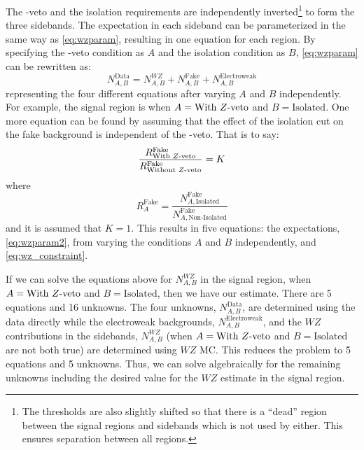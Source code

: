 The \z-veto and the isolation requirements are 
independently inverted\footnote{The thresholds are also slightly shifted 
so that there is a ``dead'' region between the signal regions and sidebands 
which is not used by either. This ensures separation between all regions.}
to form the three sidebands.
The expectation in each sideband can be parameterized
in the same way as \eqn\eqref{eq:wzparam}, resulting in one
equation for each region. By specifying the \z-veto condition
as $A$ and the isolation condition as $B$, \eqn\eqref{eq:wzparam}
can be rewritten as:
\begin{equation}
\label{eq:wzparam2}
N^{\textrm{Data}}_{A,B} =  N^{WZ}_{A,B} + N^{\textrm{Fake}}_{A,B} + N^{\textrm{Electroweak}}_{A,B}
\end{equation}
representing the four different equations after varying $A$ and $B$ independently.
For example, the signal region is when $A=\textrm{With \ensuremath{Z}-veto}$ and
$B=\textrm{Isolated}$.
One more equation can be found by assuming that the effect of 
the isolation cut on the fake background is independent of the \z-veto.
That is to say:
\begin{equation}
\label{eq:wz_constraint}
\frac{R^{\textrm{Fake}}_{\textrm{With \ensuremath{Z}-veto}}}{R^{\textrm{Fake}}_{\textrm{Without \ensuremath{Z}-veto}}} = K
\end{equation}
where 
\begin{equation}
R^{\textrm{Fake}}_{A} = 
\frac{N^{\textrm{Fake}}_{A,\textrm{Isolated}}}
{N^{\textrm{Fake}}_{A,\textrm{Non-Isolated}}}
\end{equation}
and it is assumed that $K=1$.
This results in five equations: the expectations,
\eqn\eqref{eq:wzparam2}, from varying the conditions $A$ and $B$ independently,
and \eqn\eqref{eq:wz_constraint}.




If we can solve the equations above for $N^{WZ}_{A,B}$ in the signal region,
when $A=\textrm{With \ensuremath{Z}-veto}$ and $B=\textrm{Isolated}$,
then we have our estimate. 
There are 5 equations and 16 unknowns. The four unknowns, $N^{\textrm{Data}}_{A,B}$,
are determined using the data directly while 
the electroweak backgrounds, $N^{\textrm{Electroweak}}_{A,B}$,
and the $WZ$ contributions in the sidebands, $N^{WZ}_{A,B}$ 
(when $A=\textrm{With \ensuremath{Z}-veto}$ and $B=\textrm{Isolated}$ are not both true)
are determined using $WZ$ MC. This reduces the problem to 5 equations
and 5 unknowns. Thus, we can solve algebraically for the remaining unknowns
including the desired value for the $WZ$ estimate in the signal region.

